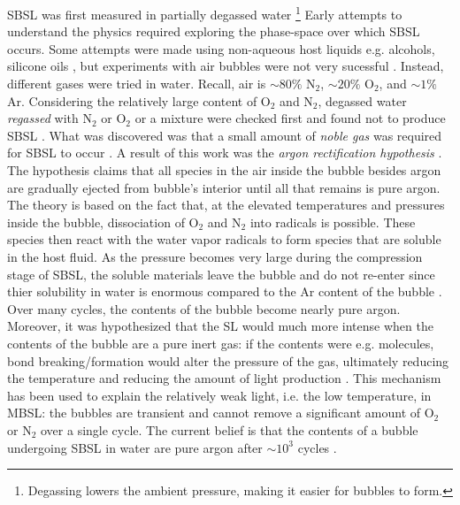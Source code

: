 \documentclass[rmp,aps,nofootinbib,superscriptaddress,floatfix]{revtex4-2}
\begin{document}
SBSL was first measured in partially degassed water \cite{gaitan1990experimental,gaitan1992sonoluminescence,brenner2002single} \footnote{Degassing lowers the ambient pressure, making it easier for bubbles to form.} Early attempts to understand the physics required exploring the phase-space over which SBSL occurs. Some attempts were made using non-aqueous host liquids e.g. alcohols, silicone oils \cite{weninger1995sonoluminescence,barber1997defining}, but experiments with air bubbles were not very sucessful \cite{barber1997defining}. Instead, different gases were tried in water. Recall, air is $\sim 80\%$ N$_2$, $\sim 20\%$ O$_2$, and $\sim 1\% $ Ar. Considering the relatively large content of O$_2$ and N$_2$, degassed water \emph{regassed} with N$_2$ or O$_2$ or a mixture were checked first and found not to produce SBSL \cite{hiller1994effect}. What was discovered was that a small amount of \emph{noble gas} was required for SBSL to occur \cite{barber1997defining,hiller1994effect,brenner2002single}. A result of this work was the \emph{argon rectification hypothesis} \cite{lohse1997sonoluminescing,brenner2002single,yasui2018acoustic,suslick2008inside}. The hypothesis claims that all species in the air inside the bubble besides argon are gradually ejected from bubble's interior until all that remains is pure argon. The theory is based on the fact that, at the elevated temperatures and pressures inside the bubble, dissociation of O$_2$ and N$_2$ into radicals is possible. These species then react with the water vapor radicals to form species that are soluble in the host fluid. As the pressure becomes very large during the compression stage of SBSL, the soluble materials leave the bubble and do not re-enter since thier solubility in water is enormous compared to the Ar content of the bubble \cite{lohse1997sonoluminescing}. Over many cycles, the contents of the bubble become nearly pure argon. Moreover, it was hypothesized that the SL would much more intense when the contents of the bubble are a pure inert gas: if the contents were e.g. molecules, bond breaking/formation would alter the pressure of the gas, ultimately reducing the temperature and reducing the amount of light production \cite{brenner2002single,yasui2018acoustic,lohse2018bubble,suslick2008inside}. This mechanism has been used to explain the relatively weak light, i.e. the low temperature, in MBSL: the bubbles are transient and cannot remove a significant amount of O$_2$ or N$_2$ over a single cycle. The current belief is that the contents of a bubble undergoing SBSL in water are pure argon after $\sim 10^3$ cycles \cite{brenner2002single,yasui2018acoustic}. 
\end{document}
